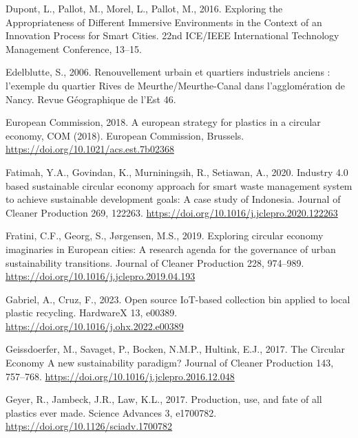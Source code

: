 \documentclass[
  11pt,
]{article}
\newlength{\cslhangindent}
\newlength{\cslentryspacingunit} %
\newenvironment{CSLReferences}[2] %
 {%
  \setlength{\parindent}{0pt}
  \ifodd #1
  \let\oldpar\par
  \def\par{\hangindent=\cslhangindent\oldpar}
  \fi
  \setlength{\parskip}{#2\cslentryspacingunit}
 }%
 {}
\begin{document}
\begin{CSLReferences}{1}{0}
\leavevmode{}%
Dupont, L., Pallot, M., Morel, L., Pallot, M., 2016. Exploring the
{Appropriateness} of {Different Immersive Environments} in the {Context}
of an {Innovation Process} for {Smart Cities}. 22nd ICE/IEEE
International Technology Management Conference, 13--15.

\leavevmode{}%
Edelblutte, S., 2006. {Renouvellement urbain et quartiers industriels
anciens : l'exemple du quartier Rives de Meurthe/Meurthe-Canal dans
l'agglomération de Nancy}. Revue Géographique de l'Est 46.

\leavevmode{}%
European Commission, 2018. A european strategy for plastics in a
circular economy, COM (2018). {European Commission}, {Brussels}.
\url{https://doi.org/10.1021/acs.est.7b02368}

\leavevmode{}%
Fatimah, Y.A., Govindan, K., Murniningsih, R., Setiawan, A., 2020.
Industry 4.0 based sustainable circular economy approach for smart waste
management system to achieve sustainable development goals: {A} case
study of {Indonesia}. Journal of Cleaner Production 269, 122263.
\url{https://doi.org/10.1016/j.jclepro.2020.122263}

\leavevmode{}%
Fratini, C.F., Georg, S., Jørgensen, M.S., 2019. Exploring circular
economy imaginaries in {European} cities: {A} research agenda for the
governance of urban sustainability transitions. Journal of Cleaner
Production 228, 974--989.
\url{https://doi.org/10.1016/j.jclepro.2019.04.193}

\leavevmode{}%
Gabriel, A., Cruz, F., 2023. Open source {IoT-based} collection bin
applied to local plastic recycling. HardwareX 13, e00389.
\url{https://doi.org/10.1016/j.ohx.2022.e00389}

\leavevmode{}%
Geissdoerfer, M., Savaget, P., Bocken, N.M.P., Hultink, E.J., 2017. The
{Circular Economy} \textendash{} {A} new sustainability paradigm?
Journal of Cleaner Production 143, 757--768.
\url{https://doi.org/10.1016/j.jclepro.2016.12.048}

\leavevmode{}%
Geyer, R., Jambeck, J.R., Law, K.L., 2017. Production, use, and fate of
all plastics ever made. Science Advances 3, e1700782.
\url{https://doi.org/10.1126/sciadv.1700782}


\end{CSLReferences}
\end{document}
